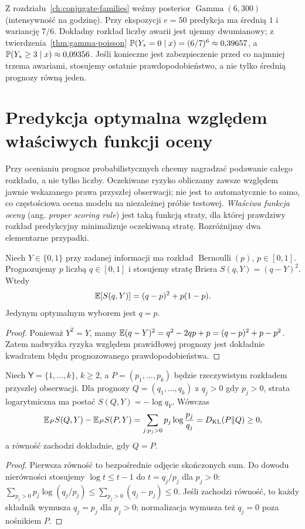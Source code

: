 \begin{przyklad}
Z rozdziału~\ref{ch:conjugate-families} weźmy posterior
$\operatorname{Gamma}(6,300)$ (intensywność na godzinę).
Przy ekspozycji $e=50$ predykcja ma średnią $1$ i wariancję
$7/6$. Dokładny rozkład liczby awarii jest ujemny
dwumianowy; z twierdzenia~\ref{thm:gamma-poisson}
$\mathbb P(Y_*=0\mid x)=(6/7)^6\approx0{,}39657$,
a $\mathbb P(Y_*\ge3\mid x)\approx0{,}09356$.
Jeśli konieczne jest zabezpieczenie przed co najmniej trzema
awariami, stosujemy ostatnie prawdopodobieństwo, a nie tylko
średnią prognozy równą jeden.
\end{przyklad}

\section{Predykcja optymalna względem właściwych funkcji oceny}
Przy ocenianiu prognoz probabilistycznych chcemy nagradzać
podawanie całego rozkładu, a nie tylko liczby. Oczekiwane
ryzyko obliczamy zawsze względem jawnie wskazanego prawa
przyszłej obserwacji; nie jest to automatycznie to samo, co
częstościowa ocena modelu na niezależnej próbie testowej. \emph{Właściwa
funkcja oceny} (ang. \emph{proper scoring rule}) jest taką funkcją
straty, dla której prawdziwy rozkład predykcyjny minimalizuje
oczekiwaną stratę. Rozróżnijmy dwa elementarne przypadki.

\begin{twierdzenie}
\label{thm:brier}
Niech $Y\in\{0,1\}$ przy zadanej informacji ma rozkład
$\operatorname{Bernoulli}(p)$, $p\in[0,1]$. Prognozujemy
$p$ liczbą $q\in[0,1]$ i stosujemy stratę Briera
$S(q,Y)=(q-Y)^2$. Wtedy
\[
\mathbb E[S(q,Y)]=(q-p)^2+p(1-p).
\]
Jedynym optymalnym wyborem jest $q=p$.
\end{twierdzenie}
\begin{proof}
Ponieważ $Y^2=Y$, mamy
$\mathbb E(q-Y)^2=q^2-2qp+p=(q-p)^2+p-p^2$.
Zatem nadwyżka ryzyka względem prawidłowej prognozy
jest dokładnie kwadratem błędu prognozowanego
prawdopodobieństwa.
\end{proof}

\begin{twierdzenie}
\label{thm:log-score-bayes}
Niech $\mathsf Y=\{1,\ldots,k\}$, $k\ge2$, a
$P=(p_1,\ldots,p_k)$ będzie rzeczywistym rozkładem przyszłej
obserwacji. Dla prognozy $Q=(q_1,\ldots,q_k)$ z $q_j>0$
gdy $p_j>0$, strata logarytmiczna ma postać
$S(Q,Y)=-\log q_Y$. Wówczas
\[
\mathbb E_P S(Q,Y)-\mathbb E_P S(P,Y)
=\sum_{j:p_j>0}p_j\log\frac{p_j}{q_j}
= D_{\mathrm{KL}}(P\Vert Q)\ge0,
\]
a równość zachodzi dokładnie, gdy $Q=P$.
\end{twierdzenie}
\begin{proof}
Pierwsza równość to bezpośrednie odjęcie skończonych sum.
Do dowodu nierówności stosujemy $\log t\le t-1$ do
$t=q_j/p_j$ dla $p_j>0$:
$\sum_{p_j>0}p_j\log(q_j/p_j)
\le\sum_{p_j>0}(q_j-p_j)\le0$.
Jeśli zachodzi równość, to każdy składnik wymusza
$q_j=p_j$ dla $p_j>0$; normalizacja wymusza też
$q_j=0$ poza nośnikiem $P$.
\end{proof}

